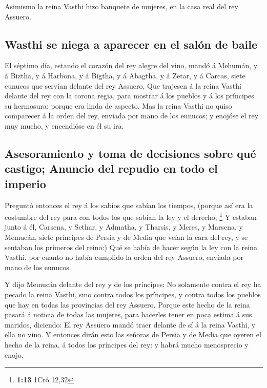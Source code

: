  Asimismo la reina Vasthi hizo banquete de mujeres, en la
casa real del rey Assuero.

\hypertarget{wasthi-se-niega-a-aparecer-en-el-saluxf3n-de-baile}{%
\subsection{Wasthi se niega a aparecer en el salón de
baile}\label{wasthi-se-niega-a-aparecer-en-el-saluxf3n-de-baile}}

 El séptimo día, estando el corazón del rey alegre del
vino, mandó á Mehumán, y á Biztha, y á Harbona, y á Bigtha, y á Abagtha,
y á Zetar, y á Carcas, siete eunucos que servían delante del rey
Assuero,  Que trajesen á la reina Vasthi delante del rey
con la corona regia, para mostrar á los pueblos y á los príncipes su
hermosura; porque era linda de aspecto.  Mas la reina
Vasthi no quiso comparecer á la orden del rey, enviada por mano de los
eunucos; y enojóse el rey muy mucho, y encendióse en él su ira.

\hypertarget{asesoramiento-y-toma-de-decisiones-sobre-quuxe9-castigo-anuncio-del-repudio-en-todo-el-imperio}{%
\subsection{Asesoramiento y toma de decisiones sobre qué castigo;
Anuncio del repudio en todo el
imperio}\label{asesoramiento-y-toma-de-decisiones-sobre-quuxe9-castigo-anuncio-del-repudio-en-todo-el-imperio}}

 Preguntó entonces el rey á los sabios que sabían los
tiempos, (porque así era la costumbre del rey para con todos los que
sabían la ley y el derecho; \footnote{\textbf{1:13} 1Cró 12,32}
 Y estaban junto á él, Carsena, y Sethar, y Admatha, y
Tharsis, y Meres, y Marsena, y Memucán, siete príncipes de Persia y de
Media que veían la cara del rey, y se sentaban los primeros del reino:)
 Qué se había de hacer según la ley con la reina Vasthi,
por cuanto no había cumplido la orden del rey Assuero, enviada por mano
de los eunucos.

 Y dijo Memucán delante del rey y de los príncipes: No
solamente contra el rey ha pecado la reina Vasthi, sino contra todos los
príncipes, y contra todos los pueblos que hay en todas las provincias
del rey Assuero.  Porque este hecho de la reina pasará á
noticia de todas las mujeres, para hacerles tener en poca estima á sus
maridos, diciendo: El rey Assuero mandó traer delante de sí á la reina
Vasthi, y ella no vino.  Y entonces dirán esto las señoras
de Persia y de Media que oyeren el hecho de la reina, á todos los
príncipes del rey: y habrá mucho menosprecio y enojo.

